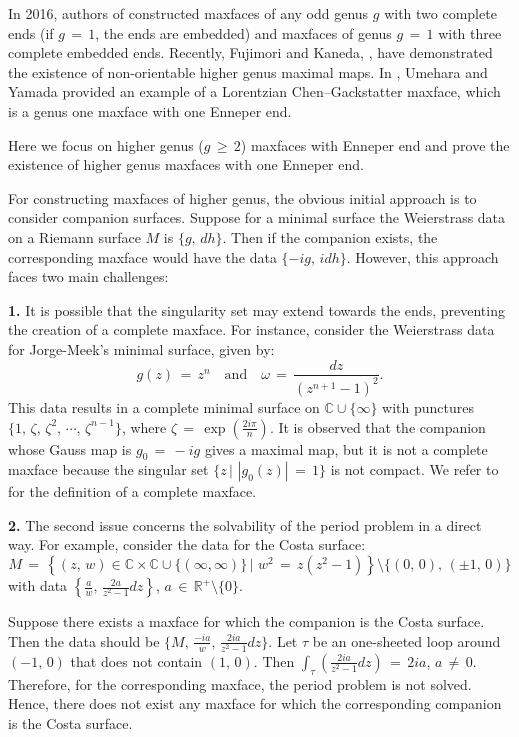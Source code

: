 \documentclass[12pt,epsfig,tikz,multi]{amsart}
\numberwithin{equation}{section}
\begin{document}
In 2016, authors of \cite{Fujimori2016highergenus} constructed maxfaces of any odd genus $g$ with two complete ends (if $g\,=\,1$, the 
ends are embedded) and maxfaces of genus $g\,=\,1$ with three complete embedded ends. Recently, Fujimori and Kaneda, 
\cite{Fujimori_nonorientable2023}, have demonstrated the existence of non-orientable higher genus maximal maps.
In \cite{UMEHARA2006}, Umehara and Yamada provided an example of a Lorentzian Chen--Gackstatter maxface, which is a genus one maxface with one Enneper end.

Here we focus on higher genus ($g \,\geq\, 2$) maxfaces with Enneper end and prove the existence of 
higher genus maxfaces with one Enneper end\color{black}.

For constructing maxfaces of higher genus, the obvious initial approach is to consider companion surfaces. Suppose for a minimal 
surface the Weierstrass data on a Riemann surface $M$ is $\lbrace g,\,dh\rbrace$. Then if the companion exists, the corresponding maxface 
would have the data $\lbrace- i g,\, i dh\rbrace$. However, this approach faces two main challenges:

\textbf{1.} It is possible that the singularity set may extend towards the ends, preventing the creation of a complete maxface. For instance, consider the Weierstrass data for Jorge-Meek's minimal surface, given by:
\[
g(z) \,=\, z^n \ \ \ \text{ and } \ \ \ \omega \,=\, \frac{dz}{(z^{n+1}-1)^2}.
\]
This data results in a complete minimal surface on $\mathbb{C}\cup\{\infty\}$ with punctures $\{1,\, \zeta, \,\zeta^2,\,
\cdots ,\, \zeta^{n-1}\}$, where $\zeta\,=\,  \exp\left({\frac{2 i  \pi}{n}}\right)$. It is observed that the companion whose Gauss
map is $g_0\,=\, -i g$ gives a maximal map, but it is not a complete maxface because the singular set $\{z\, \big\vert\,\,|g_0(z)|
\,=\,1\}$ is not compact.  We refer to \cite{UMEHARA2006} for the definition of a complete maxface. 

\textbf{2.} The second issue concerns the solvability of the period problem in a direct way. For example, consider the data for the Costa surface:
\[
M \,=\, \left\{(z,\,w) \in \mathbb{C}\times\mathbb{C}\cup\{(\infty,\infty)\} \, \big\vert\, \, w^2\,=\,z(z^2-1) \right\}
\setminus \{(0,\,0),\,(\pm 1,\,0)\}
\]
with data $\left\{\frac{a}{w},\,\frac{2a}{z^2-1}dz\right\}$, $a\,\in\,\mathbb{R}^{+}\setminus\{0\}$.

Suppose there exists a maxface for which the companion is the Costa surface. Then the data should be $\{M,\, \frac{-i a}{w},\, \frac{2i 
a}{z^2-1}dz \}$. Let $\tau$ be an one-sheeted loop around $(-1,\,0)$ that does not contain $(1,\,0)$. Then $\int_\tau(\frac{2i 
a}{z^2-1}dz)\,=\,2i a$, $a\,\neq\, 0$. Therefore, for the corresponding maxface, the period problem is not solved. Hence, there does not exist 
any maxface for which the corresponding companion is the Costa surface.
\end{document}
